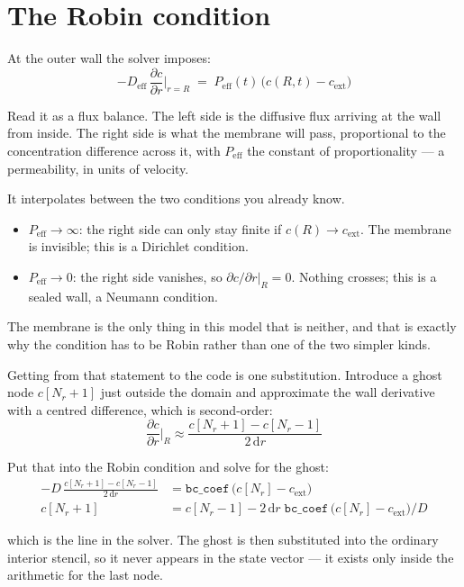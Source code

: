 \documentclass[11pt]{article}
\begin{document}
\section{The Robin condition}

At the outer wall the solver imposes:
\[
-D_{\text{eff}}\,\frac{\partial c}{\partial r}\bigg|_{r=R}
 \;=\; P_{\text{eff}}(t)\,\bigl(c(R,t) - c_{\text{ext}}\bigr)
\]

Read it as a flux balance. The left side is the diffusive flux arriving at the wall from
inside. The right side is what the membrane will pass, proportional to the concentration
difference across it, with $P_{\text{eff}}$ the constant of proportionality — a permeability,
in units of velocity.

It interpolates between the two conditions you already know.

\begin{itemize}[leftmargin=1.4em, itemsep=0.2em, topsep=0.3em]
\item $P_{\text{eff}} \to \infty$: the right side can only stay finite if
      $c(R) \to c_{\text{ext}}$. The membrane is invisible; this is a Dirichlet condition.
\item $P_{\text{eff}} \to 0$: the right side vanishes, so
      $\partial c/\partial r|_R = 0$. Nothing crosses; this is a sealed wall, a Neumann
      condition.
\end{itemize}

The membrane is the only thing in this model that is neither, and that is exactly why the
condition has to be Robin rather than one of the two simpler kinds.

Getting from that statement to the code is one substitution. Introduce a ghost node
$c[N_r{+}1]$ just outside the domain and approximate the wall derivative with a centred
difference, which is second-order:
\[
\frac{\partial c}{\partial r}\bigg|_R \approx
 \frac{c[N_r{+}1] - c[N_r{-}1]}{2\,\mathrm{d}r}
\]

Put that into the Robin condition and solve for the ghost:
\begin{align*}
-D\,\frac{c[N_r{+}1] - c[N_r{-}1]}{2\,\mathrm{d}r}
 &= \texttt{bc\_coef}\,\bigl(c[N_r] - c_{\text{ext}}\bigr) \\[0.25em]
c[N_r{+}1] &= c[N_r{-}1] - 2\,\mathrm{d}r\;\texttt{bc\_coef}\,
 \bigl(c[N_r] - c_{\text{ext}}\bigr) / D
\end{align*}

which is the line in the solver. The ghost is then substituted into the ordinary interior
stencil, so it never appears in the state vector — it exists only inside the arithmetic for
the last node.
\end{document}
